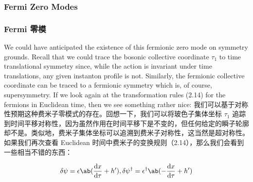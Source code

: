 \documentclass{article}
\begin{document}
\begin{paracol}{2}
\subsubsection{Fermi Zero Modes}
\switchcolumn
\subsubsection*{Fermi 零模}
\switchcolumn*

We could have anticipated the existence of this fermionic zero mode on symmetry grounds. Recall that we could trace the bosonic collective coordinate $\tau_1$ to time translational symmetry since, while the action is invariant under time translations, any given instanton profile is not. Similarly, the fermionic collective coordinate can be traced to a fermionic symmetry which is, of course, supersymmetry. If we look again at the transformation rules (2.14) for the fermions in Euclidean time, then we see something rather nice:
\switchcolumn
我们可以基于对称性预期这种费米子零模式的存在。回想一下，我们可以将玻色子集体坐标 $\tau_1$ 追踪到时间平移对称性，因为虽然作用在时间平移下是不变的，但任何给定的瞬子轮廓却不是。类似地，费米子集体坐标可以追溯到费米子对称性，这当然是超对称性。如果我们再次查看 Euclidean 时间中费米子的变换规则（2.14），那么我们会看到一些相当不错的东西：
\end{paracol}

\[ \delta \psi = \epsilon \ab(\odv{x}{\tau} + h'), \delta \psi^{\dagger} = \epsilon^{\dagger} \ab(- \odv{x}{\tau} + h') \]
\end{document}

